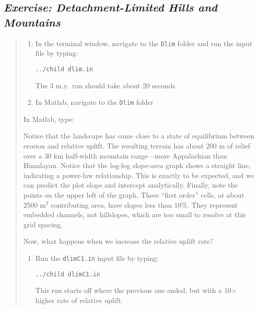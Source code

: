 \documentclass[12pt,reqno]{amsart}
\begin{document}
\subsection*{\em Exercise: Detachment-Limited Hills and Mountains}

\begin{quote}
\small
{\sf
\begin{enumerate}
\item
In the terminal window, navigate to the {\tt Dlim} folder and run the
input file by typing:

{\tt ../child dlim.in}

The 3 m.y.\ run should take about 20 seconds.
\item
In Matlab, navigate to the {\tt Dlim} folder
\end{enumerate}

In Matlab, type:

\noindent
Notice that the landscape has come close to a state of equilibrium
between erosion and relative uplift. The resulting terrain has about
200 m of relief over a 30 km half-width mountain range---more
Appalachian than Himalayan. Notice that the log-log slope-area graph
shows a straight line, indicating a power-law relationship. This is
exactly to be expected, and we can predict the plot slope and
intercept analytically. Finally, note the points on the upper left of
the graph. These ``first order'' cells, at about 2500 m$^2$
contributing area, have slopes less than 10\%. They represent embedded
channels, not hillslopes, which are too small to resolve at this grid
spacing.

Now, what happens when we increase the relative uplift rate?

\begin{enumerate}
\item
Run the {\tt dlimC1.in} input file by typing:

{\tt ../child dlimC1.in}

This run starts off where the previous one ended, but with a 10$\times$ higher rate of relative uplift.
\end{enumerate}

}
\end{quote}
\end{document}
